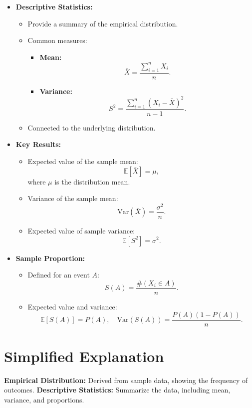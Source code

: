 \documentclass{article}
\begin{document}
\begin{itemize}
  \item \textbf{Descriptive Statistics:}
    \begin{itemize}
      \item Provide a summary of the empirical distribution.
      \item Common measures:
        \begin{itemize}
          \item \textbf{Mean:}
            \[
              \bar{X} = \frac{\sum_{i=1}^n X_i}{n}.
            \]
          \item \textbf{Variance:}
            \[
              S^2 = \frac{\sum_{i=1}^n (X_i - \bar{X})^2}{n-1}.
            \]
        \end{itemize}
      \item Connected to the underlying distribution.
    \end{itemize}

  \item \textbf{Key Results:}
    \begin{itemize}
      \item Expected value of the sample mean:
        \[
          \mathbb{E}[\bar{X}] = \mu,
        \]
        where $\mu$ is the distribution mean.
      \item Variance of the sample mean:
        \[
          \text{Var}(\bar{X}) = \frac{\sigma^2}{n}.
        \]
      \item Expected value of sample variance:
        \[
          \mathbb{E}[S^2] = \sigma^2.
        \]
    \end{itemize}

  \item \textbf{Sample Proportion:}
    \begin{itemize}
      \item Defined for an event $A$:
        \[
          S(A) = \frac{\#(X_i \in A)}{n}.
        \]
      \item Expected value and variance:
        \[
          \mathbb{E}[S(A)] = P(A), \quad \text{Var}(S(A)) = \frac{P(A)(1-P(A))}{n}.
        \]
    \end{itemize}
\end{itemize}

\section*{Simplified Explanation}

\textbf{Empirical Distribution:} Derived from sample data, showing the frequency of outcomes.
\textbf{Descriptive Statistics:} Summarize the data, including mean, variance, and proportions.
\end{document}

